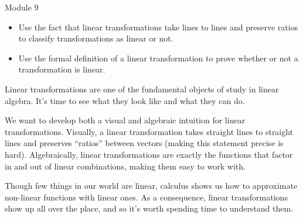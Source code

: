 \begin{lesson}

	Module 9

	\begin{itemize}
		\item Use the fact that linear transformations take lines to lines and preserve
			ratios to classify transformations as linear or not.
		\item Use the formal definition of a linear transformation to prove whether or not a
			transformation is linear.
	\end{itemize}

		Linear transformations are one of the fundamental objects of study in linear algebra.
		It's time to see what they look like and what they can do.

		We want to develop both a visual and algebraic intuition for linear transformations.
		Visually, a linear transformation takes straight lines to straight lines and preserves ``ratios'' between
		vectors (making this statement precise is hard). Algebraically, linear transformations are exactly
		the functions that factor in and out of linear combinations, making them easy to work with.

		Though few things in our world are linear, calculus shows us how to approximate
		non-linear functions with linear ones. As a consequence, linear transformations show
		up all over the place, and so it's worth spending time to understand them.
\end{lesson}

